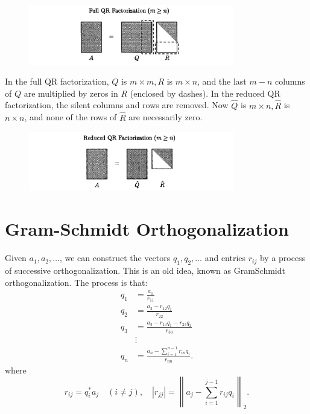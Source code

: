 \begin{figure}[H]
    \centering
    \includegraphics[width=0.8\textwidth]{figures/7-1.png}
\end{figure}

In the full QR factorization, $Q$ is $m \times m, R$ is $m \times n$, and the last $m-n$ columns of $Q$ are multiplied by zeros in $R$ (enclosed by dashes). In the reduced QR factorization, the silent columns and rows are removed. Now $\hat{Q}$ is $m \times n, \hat{R}$ is $n \times n$, and none of the rows of $\hat{R}$ are necessarily zero.

\begin{figure}[H]
    \centering
    \includegraphics[width=0.8\textwidth]{figures/7-2.png}
\end{figure}

\section{Gram-Schmidt Orthogonalization}
Given $a_1, a_2, \ldots$, we can construct the vectors $q_1, q_2, \ldots$ and entries $r_{i j}$ by a process of successive orthogonalization. This is an old idea, known as GramSchmidt orthogonalization. The process is that: 
\[
    \begin{aligned}
        q_1 & =\frac{a_1}{r_{11}} \\
        q_2 & =\frac{a_2-r_{12} q_1}{r_{22}} \\
        q_3 & =\frac{a_3-r_{13} q_1-r_{23} q_2}{r_{33}} \\
        & \vdots \\
        q_n & =\frac{a_n-\sum_{i=1}^{n-1} r_{i n} q_i}{r_{n n}}. 
        \end{aligned}
\]
where 
\[
    r_{i j}=q_i^* a_j \quad(i \neq j), \quad \left|r_{j j}\right|=\left\|a_j-\sum_{i=1}^{j-1} r_{i j} q_i\right\|_2 .
\]

